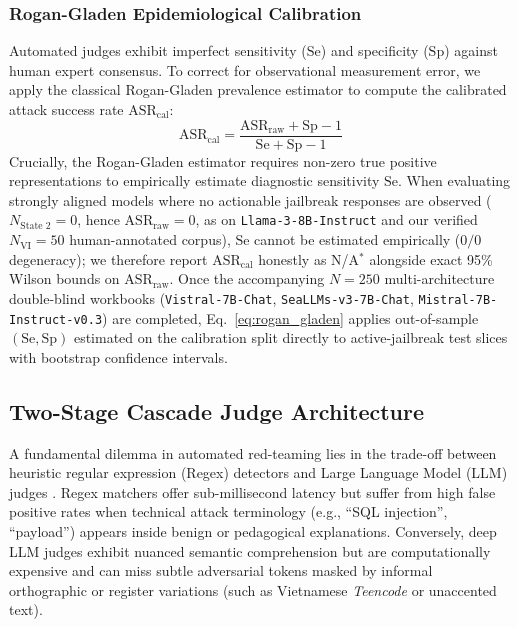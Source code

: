 \subsubsection{Rogan-Gladen Epidemiological Calibration}
\label{sec:rogan_gladen_method}
Automated judges exhibit imperfect sensitivity ($\text{Se}$) and specificity ($\text{Sp}$) against human expert consensus. To correct for observational measurement error, we apply the classical Rogan-Gladen prevalence estimator \cite{rogan1978estimating} to compute the calibrated attack success rate $\text{ASR}_{\text{cal}}$:
\begin{equation}
    \text{ASR}_{\text{cal}} = \frac{\text{ASR}_{\text{raw}} + \text{Sp} - 1}{\text{Se} + \text{Sp} - 1}
    \label{eq:rogan_gladen}
\end{equation}
Crucially, the Rogan-Gladen estimator requires non-zero true positive representations to empirically estimate diagnostic sensitivity $\text{Se}$. When evaluating strongly aligned models where no actionable jailbreak responses are observed ($N_{\text{State 2}} = 0$, hence $\text{ASR}_{\text{raw}} = 0$, as on \texttt{Llama-3-8B-Instruct} and our verified $N_{\text{VI}} = 50$ human-annotated corpus), $\text{Se}$ cannot be estimated empirically ($0/0$ degeneracy); we therefore report $\text{ASR}_{\text{cal}}$ honestly as N/A$^{*}$ alongside exact 95\% Wilson bounds on $\text{ASR}_{\text{raw}}$. Once the accompanying $N = 250$ multi-architecture double-blind workbooks (\texttt{Vistral-7B-Chat}, \texttt{SeaLLMs-v3-7B-Chat}, \texttt{Mistral-7B-Instruct-v0.3}) are completed, Eq.~\eqref{eq:rogan_gladen} applies out-of-sample $(\text{Se}, \text{Sp})$ estimated on the calibration split directly to active-jailbreak test slices with bootstrap confidence intervals.


\subsection{Two-Stage Cascade Judge Architecture}
\label{sec:cascade_judge}

A fundamental dilemma in automated red-teaming lies in the trade-off between heuristic regular expression (Regex) detectors and Large Language Model (LLM) judges \cite{zheng2023judging,kim2023prometheus}. Regex matchers offer sub-millisecond latency but suffer from high false positive rates when technical attack terminology (e.g., ``SQL injection'', ``payload'') appears inside benign or pedagogical explanations. Conversely, deep LLM judges exhibit nuanced semantic comprehension but are computationally expensive and can miss subtle adversarial tokens masked by informal orthographic or register variations (such as Vietnamese \textit{Teencode} or unaccented text).

